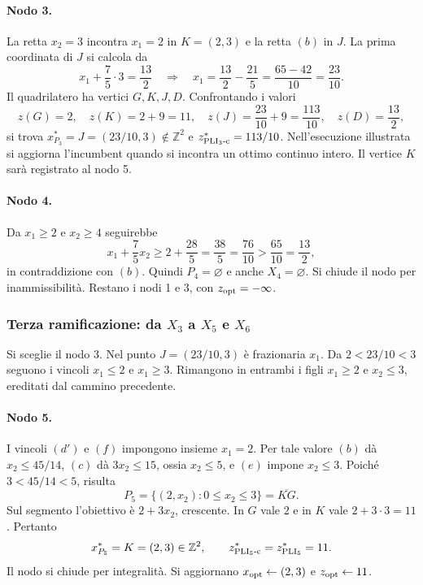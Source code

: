 \paragraph{Nodo 3.}
La retta $x_2=3$ incontra $x_1=2$ in $K=(2,3)$ e la retta $(b)$ in $J$.
La prima coordinata di $J$ si calcola da
\[
 x_1+\frac75\cdot3=\frac{13}{2}
 \quad\Longrightarrow\quad
 x_1=\frac{13}{2}-\frac{21}{5}=\frac{65-42}{10}=\frac{23}{10}.
\]
Il quadrilatero ha vertici $G,K,J,D$. Confrontando i valori
\[
 z(G)=2,\quad z(K)=2+9=11,\quad
 z(J)=\frac{23}{10}+9=\frac{113}{10},\quad z(D)=\frac{13}{2},
\]
si trova $x^*_{P_3}=J=(23/10,3)\notin\mathbb Z^2$ e
$z^*_{\mathrm{PLI}_{3}\text{-c}}=113/10$. Nell'esecuzione illustrata si aggiorna
l'incumbent quando si incontra un ottimo continuo intero. Il vertice $K$
sarà registrato al nodo 5.

\paragraph{Nodo 4.}
Da $x_1\geq2$ e $x_2\geq4$ seguirebbe
\[
 x_1+\frac75x_2\geq2+\frac{28}{5}=\frac{38}{5}
  =\frac{76}{10}>\frac{65}{10}=\frac{13}{2},
\]
in contraddizione con $(b)$. Quindi $P_4=\varnothing$ e anche
$X_4=\varnothing$. Si chiude il nodo per inammissibilità. Restano i nodi
1 e 3, con $z_{\mathrm{opt}}=-\infty$.

\subsubsection{Terza ramificazione: da $X_3$ a $X_5$ e $X_6$}

Si sceglie il nodo 3. Nel punto $J=(23/10,3)$ è frazionaria $x_1$.
Da $2<23/10<3$ seguono i vincoli $x_1\leq2$ e $x_1\geq3$.
Rimangono in entrambi i figli $x_1\geq2$ e $x_2\leq3$, ereditati
dal cammino precedente.


\paragraph{Nodo 5.}
I vincoli $(d')$ e $(f)$ impongono insieme $x_1=2$. Per tale valore
$(b)$ dà $x_2\leq45/14$, $(c)$ dà $3x_2\leq15$, ossia $x_2\leq5$,
e $(e)$ impone $x_2\leq3$. Poiché $3<45/14<5$, risulta
\[
 P_5=\{(2,x_2):0\leq x_2\leq3\}=\overline{KG}.
\]
Sul segmento l'obiettivo è $2+3x_2$, crescente. In $G$ vale $2$ e in
$K$ vale $2+3\cdot3=11$. Pertanto
\[
 x^*_{P_5}=K=(2,3)\in\mathbb Z^2,\qquad
 z^*_{\mathrm{PLI}_{5}\text{-c}}=z^*_{\mathrm{PLI}_{5}}=11.
\]
Il nodo si chiude per integralità. Si aggiornano
$x_{\mathrm{opt}}\gets(2,3)$ e $z_{\mathrm{opt}}\gets11$.

